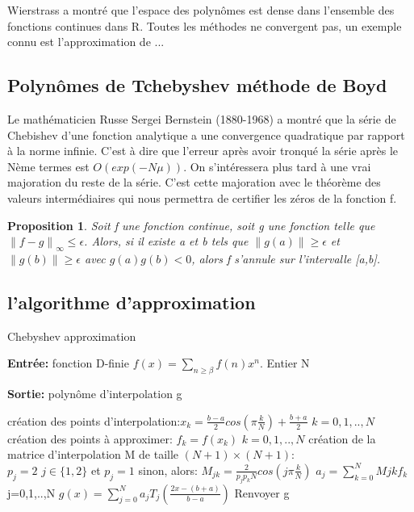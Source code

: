 \documentclass[a4paper,11pt]{article}
\begin{document}
Wierstrass a montré que l'espace des polynômes est dense dans l'ensemble des fonctions continues dans R. Toutes les méthodes ne convergent pas, un exemple connu est l'approximation de ...

\subsection{Polynômes de Tchebyshev méthode de Boyd}


Le mathématicien Russe Sergei Bernstein (1880-1968) a montré que la série de Chebishev d'une fonction analytique a une convergence quadratique par rapport à la norme infinie. C'est à dire que l'erreur après avoir tronqué la série après le Nème termes est $O(exp(-N\mu))$. On s'intéressera plus tard à une vrai majoration du reste de la série.
C'est cette majoration avec le théorème des valeurs intermédiaires qui nous permettra de certifier les zéros de la fonction f.

\newtheorem{proposition}{Proposition}
\begin{proposition}
Soit f une fonction continue, soit g une fonction telle que \\
$\left\|f-g \right\|_{\infty} \leq \epsilon$. Alors, si il existe a et b tels que $\left\|g(a)\right\| \geq \epsilon$ et $\left\|g(b)\right\| \geq \epsilon$ avec $g(a)g(b) < 0$, alors f s'annule sur l'intervalle [a,b].

\end{proposition}

\subsection{l'algorithme d'approximation}


\begin{algorithm}
	\caption{Chebyshev approximation}
	
	\vspace{2mm}
	
	\textbf{Entrée:} fonction D-finie $f(x)=\sum_{n \geq\beta} f(n)x^{n}$. Entier N
	
	\textbf{Sortie:} polynôme d'interpolation g
	
	\begin{algorithmic}[1]
		
		\STATE création des points d'interpolation:$x_{k}=\frac{b-a}{2}cos(\pi\frac{k}{N})+\frac{b+a}{2}$  $k=0,1,..,N$
		\STATE création des points à approximer: $f_{k}=f(x_{k})$ $k=0,1,..,N$
		\STATE création de la matrice d'interpolation M de taille $(N+1)\times (N+1)$:\\
		$p_{j}=2$ $j\in\{1,2\}$ et $p_{j}=1$ sinon, alors:
		$M_{jk}=\frac{2}{p_{j}p_{k}N}cos(j\pi\frac{k}{N})$
		\STATE $a_{j}=\sum_{k=0}^{N}M{jk}f_{k}$ j=0,1,..,N
		\STATE $g(x)=\sum_{j=0}^{N}a_{j}T_{j}(\frac{2x-(b+a)}{b-a})$
		\STATE Renvoyer g
	\end{algorithmic}
	
\end{algorithm}
\end{document}
